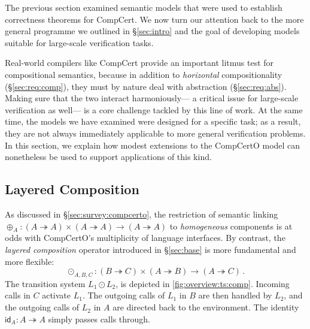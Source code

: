 \documentclass[acmsmall,screen,review,anonymous]{acmart}
\newcommand{\kw}[1]{\ensuremath{ \mathsf{#1} }}
\begin{document}

The previous section
examined semantic models
that were
used to establish correctness theorems for CompCert.
We now turn our attention back to the more general
programme we outlined in \S\ref{sec:intro}
and the goal of developing models
suitable for large-scale verification tasks.

Real-world compilers like CompCert provide an important litmus test
for compositional semantics,
because in addition to \emph{horizontal} compositionality (\S\ref{sec:req:comp}),
they must by nature deal with abstraction (\S\ref{sec:req:abs}).
Making sure that the two interact harmoniously---%
a critical issue for large-scale verification as well---%
is a core challenge tackled by this line of work.
At the same time,
the models we have examined
were designed for a specific task;
as a result, they are not always immediately applicable
to more general verification problems.
In this section,
we explain how
modest extensions to the CompCertO model
can nonetheless be used to
support applications of this kind.


\subsection{Layered Composition} \label{sec:overview:lcomp} %


As discussed in \S\ref{sec:survey:compcerto},
the restriction of semantic linking
$
  {\oplus}_A : (A \twoheadrightarrow A) \times (A \twoheadrightarrow A)
  \rightarrow (A \twoheadrightarrow A)
$
to \emph{homogeneous} components
is at odds with
CompCertO's multiplicity of language interfaces.
By contrast,
the \emph{layered composition} operator
introduced in \S\ref{sec:base}
is more fundamental and more flexible:
\[
  {\odot}_{A,B,C} :
    (B \twoheadrightarrow C) \times
    (A \twoheadrightarrow B) \rightarrow
    (A \twoheadrightarrow C)
  \,.
\]
The transition system $L_1 \odot L_2$,
is depicted in \autoref{fig:overview:ts:comp}.
Incoming calls in $C$ activate $L_1$.
The outgoing calls of $L_1$ in $B$ are then handled by $L_2$, and
the outgoing calls of $L_2$ in $A$
are directed back to the environment.
The identity $\kw{id}_A : A \twoheadrightarrow A$
simply passes calls through.

\end{document}

